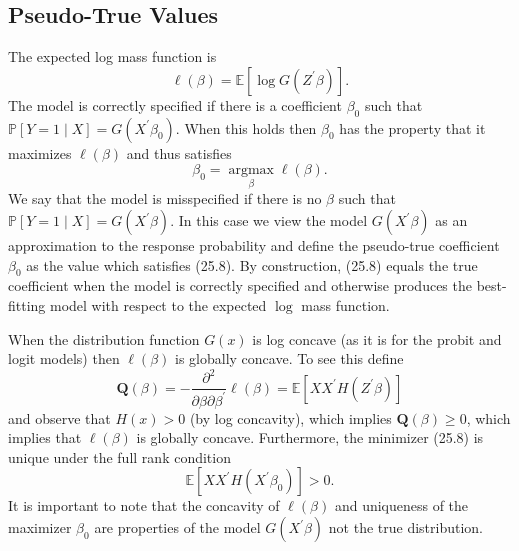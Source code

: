 \documentclass[10pt]{article}
\begin{document}
\subsection{Pseudo-True Values}
The expected log mass function is
$$
\ell(\beta)=\mathbb{E}\left[\log G\left(Z^{\prime} \beta\right)\right] .
$$
The model is correctly specified if there is a coefficient $\beta_{0}$ such that $\mathbb{P}[Y=1 \mid X]=G\left(X^{\prime} \beta_{0}\right)$. When this holds then $\beta_{0}$ has the property that it maximizes $\ell(\beta)$ and thus satisfies
$$
\beta_{0}=\underset{\beta}{\operatorname{argmax}} \ell(\beta) .
$$
We say that the model is misspecified if there is no $\beta$ such that $\mathbb{P}[Y=1 \mid X]=G\left(X^{\prime} \beta\right)$. In this case we view the model $G\left(X^{\prime} \beta\right)$ as an approximation to the response probability and define the pseudo-true coefficient $\beta_{0}$ as the value which satisfies (25.8). By construction, (25.8) equals the true coefficient when the model is correctly specified and otherwise produces the best-fitting model with respect to the expected $\log$ mass function.

When the distribution function $G(x)$ is log concave (as it is for the probit and logit models) then $\ell(\beta)$ is globally concave. To see this define
$$
\boldsymbol{Q}(\beta)=-\frac{\partial^{2}}{\partial \beta \partial \beta^{\prime}} \ell(\beta)=\mathbb{E}\left[X X^{\prime} H\left(Z^{\prime} \beta\right)\right]
$$
and observe that $H(x)>0$ (by log concavity), which implies $\boldsymbol{Q}(\beta) \geq 0$, which implies that $\ell(\beta)$ is globally concave. Furthermore, the minimizer (25.8) is unique under the full rank condition
$$
\mathbb{E}\left[X X^{\prime} H\left(X^{\prime} \beta_{0}\right)\right]>0 .
$$
It is important to note that the concavity of $\ell(\beta)$ and uniqueness of the maximizer $\beta_{0}$ are properties of the model $G\left(X^{\prime} \beta\right)$ not the true distribution.
\end{document}
